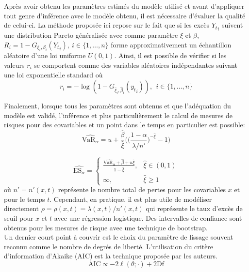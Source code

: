 Après avoir obtenu les paramètres estimés du modèle utilisé et avant d'appliquer tout genre d'inférence avec le modèle obtenu, il est nécessaire d'évaluer la qualité de celui-ci. La méthode proposée ici repose sur le fait que si les excès ${Y_t}_{i}$ suivent une distribution Pareto généralisée avec comme paramètre $\xi$ et $\beta$, $R_i = 1 - G_{\xi_i, \beta_i} ({Y_t}_{i}), \ i \in \{1, \dots, n\}$ forme approximativement un échantillon aléatoire d'une loi uniforme $U(0,1)$. Ainsi, il est possible de vérifier si les valeurs $r_i$ se comportent comme des variables aléatoires indépendantes suivant une loi exponentielle standard où
\begin{equation}\label{eq:2.2.12}
r_i = -\log(1 - G_{\hat\xi_i, \hat\beta_i}({y_t}_{i})), \ \ i \in \{1, \dots, n\}
\end{equation}

Finalement, lorsque tous les paramètres sont obtenus et que l'adéquation du modèle est validé, l'inférence et plus particulièrement le calcul de mesures de risques pour des covariables et un point dans le temps en particulier est possible:
\begin{equation}\label{eq:2.2.13}
\widehat{\text{VaR}_\alpha} = u + \frac{\hat\beta}{\hat\xi} \Bigg(\Bigg( \frac{1-\alpha}{\hat\lambda/n'}\Bigg)^{-\hat\xi} -1 \Bigg)
\end{equation}

\begin{equation}\label{eq:2.2.14}
\widehat{\text{ES}_\alpha} =
\begin{cases}
\frac{\widehat{\text{VaR}_\alpha} + \hat\beta + u\hat\xi}{1-\hat\xi}, & \hat{\xi} \in (0,1) \\
\infty, & \hat\xi 	\ge 1
\end{cases}
\end{equation}
où $n' = n'(x,t)$ représente le nombre total de pertes pour les covariables $x$ et pour le temps $t$. Cependant, en pratique, il est plus utile de modéliser directement $\rho = \rho(x, t) = \lambda(x,t)/n'(x, t)$ qui représente le taux d'excès de seuil pour $x$ et $t$ avec une régression logistique. Des intervalles de confiance sont obtenus pour les mesures de risque avec une technique de bootstrap.
\\

Un dernier court point à couvrir est le choix du paramètre de lissage souvent reconnu comme le nombre de degrés de liberté. L'utilisation du critère d'information d'Akaike (AIC) est la technique proposée par les auteurs.
\begin{equation}\label{eq:2.2.15}
\text{AIC} \propto -2 \ell(\theta; \cdot) + 2\text{Df}
\end{equation}

